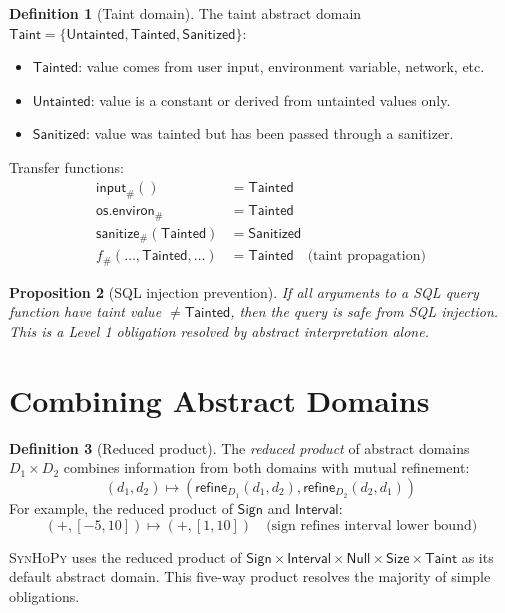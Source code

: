 \documentclass[11pt,a4paper]{report}
\theoremstyle{definition}
\newtheorem{definition}{Definition}[chapter]
\theoremstyle{plain}
\newtheorem{proposition}[definition]{Proposition}
\newcommand{\synhopy}{\textsc{SynHoPy}}
\begin{document}
\begin{definition}[Taint domain]
The taint abstract domain $\mathsf{Taint} = \{\mathsf{Untainted}, \mathsf{Tainted}, \mathsf{Sanitized}\}$:
\begin{itemize}
  \item $\mathsf{Tainted}$: value comes from user input, environment variable, network, etc.
  \item $\mathsf{Untainted}$: value is a constant or derived from untainted values only.
  \item $\mathsf{Sanitized}$: value was tainted but has been passed through a sanitizer.
\end{itemize}
Transfer functions:
\begin{align}
  \mathsf{input}_\#() &= \mathsf{Tainted} \\
  \mathsf{os.environ}_\# &= \mathsf{Tainted} \\
  \mathsf{sanitize}_\#(\mathsf{Tainted}) &= \mathsf{Sanitized} \\
  f_\#(\ldots, \mathsf{Tainted}, \ldots) &= \mathsf{Tainted} \quad \text{(taint propagation)}
\end{align}
\end{definition}

\begin{proposition}[SQL injection prevention]
If all arguments to a SQL query function have taint value $\neq \mathsf{Tainted}$,
then the query is safe from SQL injection.  This is a Level 1 obligation
resolved by abstract interpretation alone.
\end{proposition}


\section{Combining Abstract Domains}

\begin{definition}[Reduced product]
The \emph{reduced product} of abstract domains $D_1 \times D_2$ combines
information from both domains with mutual refinement:
\[
  (d_1, d_2) \mapsto (\mathsf{refine}_{D_1}(d_1, d_2), \mathsf{refine}_{D_2}(d_2, d_1))
\]
For example, the reduced product of $\mathsf{Sign}$ and $\mathsf{Interval}$:
\[
  (+, [-5, 10]) \mapsto (+, [1, 10]) \quad \text{(sign refines interval lower bound)}
\]
\end{definition}

\synhopy{} uses the reduced product of $\mathsf{Sign} \times \mathsf{Interval} \times
\mathsf{Null} \times \mathsf{Size} \times \mathsf{Taint}$ as its default
abstract domain.  This five-way product resolves the majority of simple obligations.
\end{document}

